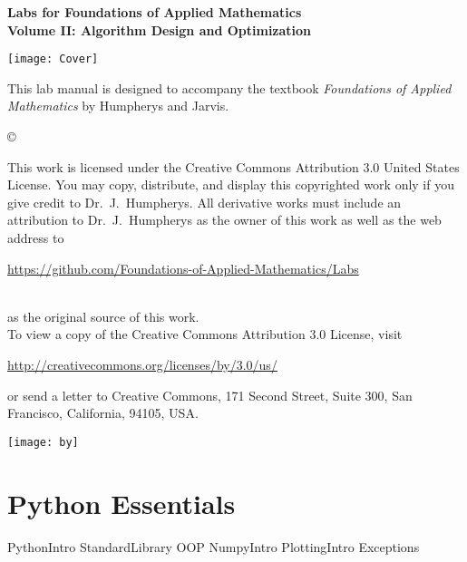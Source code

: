 \documentclass[nociteref]{SIAM-GH-book}
\begin{document}

\thispagestyle{empty} %

\begin{center}
{\huge \bf Labs for Foundations of Applied Mathematics} \\
\vspace{5mm}
{\Large \bf Volume II: Algorithm Design and Optimization}
\vspace{20mm}

\texttt{[image: Cover]}
\end{center}
\frontmatter



\begin{thepreface} %

This lab manual is designed to accompany the textbook \emph{Foundations of Applied Mathematics} by Humpherys and Jarvis.

\vfill
\copyright{This work is licensed under the Creative Commons Attribution 3.0 United States
License.  You may copy, distribute, and display this copyrighted work only if you give
credit to Dr.~J.~Humpherys. All derivative works must include an attribution to Dr.~J.~Humpherys as the owner of this work as well as the web address to
\\\centerline{\url{https://github.com/Foundations-of-Applied-Mathematics/Labs}}\\as the original source of this work.
\\To view a copy of the Creative Commons Attribution 3.0 License, visit
\\\centerline{\url{http://creativecommons.org/licenses/by/3.0/us/}} or send a letter to Creative Commons, 171 Second Street, Suite 300, San Francisco, California, 94105, USA.}

\vfill
\centering\texttt{[image: by]}
\vfill
\end{thepreface}

\setcounter{tocdepth}{1}
\tableofcontents

\mainmatter %

\part{Python Essentials} %
{PythonIntro}
{StandardLibrary}
{OOP}
{NumpyIntro}
{PlottingIntro}
{Exceptions}
\end{document}
